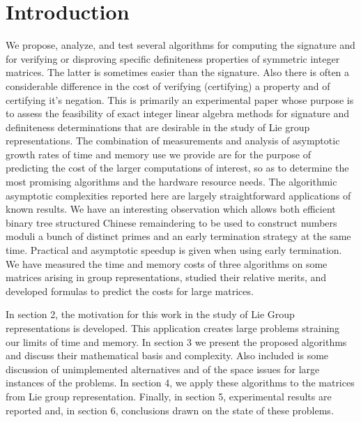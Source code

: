 \documentclass{acm_proc_article-sp}
\begin{document}


\section{Introduction}

We propose, analyze, and test several algorithms for 
computing the signature and for verifying or disproving specific
definiteness properties of symmetric integer matrices.  
The latter is sometimes easier than the signature.  
Also there is often a considerable difference in the 
cost of verifying (certifying) a property and of certifying it's negation.
This is primarily an experimental paper whose purpose is to assess the feasibility 
of exact integer linear algebra methods for signature and definiteness determinations
that are desirable in the study of Lie group representations.
The combination of measurements and analysis of asymptotic growth rates of time
and memory use we provide are for the purpose of predicting the cost of the larger
computations of interest, so as to determine the most promising algorithms and the 
hardware resource needs.
The algorithmic asymptotic complexities reported here are largely straightforward 
applications of known results. 
We have an interesting observation which
allows both efficient binary tree structured Chinese remaindering to be used to construct 
numbers moduli a bunch of distinct primes and an early termination strategy at the same time.
Practical and asymptotic speedup is given when using early termination.
We have measured the time and memory costs of three algorithms on some matrices arising
in group representations, 
studied their relative merits, and developed formulas to predict the costs for large matrices.

In section 2, the motivation for this work in the study of Lie Group
representations is developed.  This application creates large problems
straining our limits of time and memory.
In section 3 we present the proposed algorithms and discuss their mathematical
basis and complexity.
Also included is some discussion
of unimplemented alternatives and of the space issues for large instances
of the problems. In section 4, we apply these algorithms to the matrices from 
Lie group representation.
Finally, in section 5, experimental results are reported
and, in section 6, conclusions drawn on the state of these problems.
\end{document}
